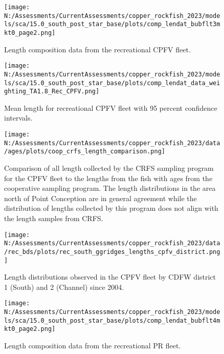 \documentclass[11pt,
  english,
  letterpaper,
]{article}
\begin{document}
\pagebreak

\begin{figure}
\centering
\texttt{[image: N:/Assessments/CurrentAssessments/copper\_rockfish\_2023/models/sca/15.0\_south\_post\_star\_base/plots/comp\_lendat\_bubflt3mkt0\_page2.png]}
\caption{Length composition data from the recreational CPFV fleet.\label{fig:rec-cpfv-len-data}}
\end{figure}

\pagebreak

\begin{figure}
\centering
\texttt{[image: N:/Assessments/CurrentAssessments/copper\_rockfish\_2023/models/sca/15.0\_south\_post\_star\_base/plots/comp\_lendat\_data\_weighting\_TA1.8\_Rec\_CPFV.png]}
\caption{Mean length for recreational CPFV fleet with 95 percent confidence intervals.\label{fig:mean-rec-cpfv-len-data}}
\end{figure}

\pagebreak

\begin{figure}
\centering
\texttt{[image: N:/Assessments/CurrentAssessments/copper\_rockfish\_2023/data/ages/plots/coop\_crfs\_length\_comparison.png]}
\caption{Comparison of all length collected by the CRFS sampling program for the CPFV fleet to the lengths from the fish with ages from the cooperative sampling program. The length distributions in the area north of Point Conception are in general agreement while the distribution of lengths collected by this program does not align with the length samples from CRFS.\label{fig:coop-len-comparison}}
\end{figure}

\pagebreak

\begin{figure}
\centering
\texttt{[image: N:/Assessments/CurrentAssessments/copper\_rockfish\_2023/data/rec\_bds/plots/rec\_south\_ggridges\_lengths\_cpfv\_district.png]}
\caption{Length distributions observed in the CPFV fleet by CDFW district 1 (South) and 2 (Channel) since 2004.\label{fig:rec-cpfv-dist}}
\end{figure}

\pagebreak

\begin{figure}
\centering
\texttt{[image: N:/Assessments/CurrentAssessments/copper\_rockfish\_2023/models/sca/15.0\_south\_post\_star\_base/plots/comp\_lendat\_bubflt4mkt0\_page2.png]}
\caption{Length composition data from the recreational PR fleet.\label{fig:rec-pr-len-data}}
\end{figure}
\end{document}
